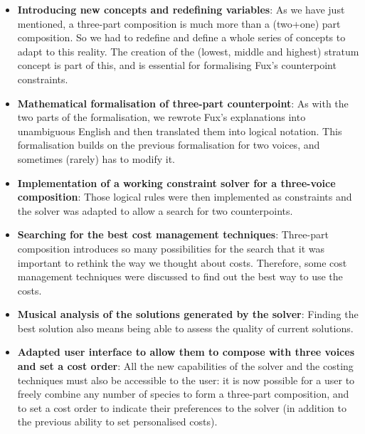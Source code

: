 \begin{itemize}
    \item \textbf{Introducing new concepts and redefining variables}:
    As we have just mentioned, a three-part composition is much more than a (two+one) part composition. So we had to redefine and define a whole series of concepts to adapt to this reality. The creation of the (lowest, middle and highest) stratum concept is part of this, and is essential for formalising Fux's counterpoint constraints.
    \item \textbf{Mathematical formalisation of three-part counterpoint}: As with the two parts of the formalisation, we rewrote Fux's explanations into unambiguous English and then translated them into logical notation. This formalisation builds on the previous formalisation for two voices, and sometimes (rarely) has to modify it.
    \item \textbf{Implementation of a working constraint solver for a three-voice composition}: Those logical rules were then implemented as constraints and the solver was adapted to allow a search for two counterpoints.
    \item \textbf{Searching for the best cost management techniques}: Three-part composition introduces so many possibilities for the search that it was important to rethink the way we thought about costs. Therefore, some cost management techniques were discussed to find out the best way to use the costs.
    \item \textbf{Musical analysis of the solutions generated by the solver}: Finding the best solution also means being able to assess the quality of current solutions.
    \item \textbf{Adapted user interface to allow them to compose with three voices and set a cost order}: All the new capabilities of the solver and the costing techniques must also be accessible to the user: it is now possible for a user to freely combine any number of species to form a three-part composition, and to set a cost order to indicate their preferences to the solver (in addition to the previous ability to set personalised costs).
\end{itemize}

